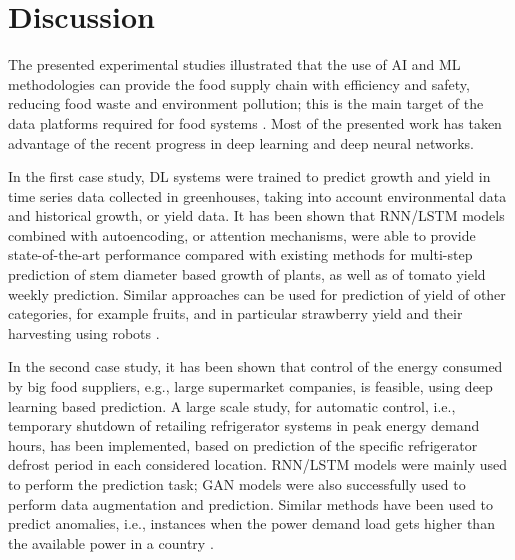 \documentclass[journal,article,accept,moreauthors,pdftex]{Definitions/mdpi}
\begin{document}


\section{Discussion}

The presented experimental studies illustrated that the use of AI and ML methodologies can provide the food supply chain with efficiency and safety, reducing food waste and environment pollution; this is the main target of the data platforms required for food systems \cite{ref52, ref53}.
Most of the presented work has taken advantage of the recent progress in deep learning and deep neural networks. 

In the first  case study, DL systems were trained to predict growth and yield in time series data collected in greenhouses, taking into account environmental data and historical growth, or yield data. It has been shown that RNN/LSTM models combined with autoencoding, or attention mechanisms, were able to provide state-of-the-art performance compared with existing  methods for multi-step prediction of stem diameter based growth of plants, as well as of tomato yield weekly prediction.  Similar approaches can be used for prediction of yield of other categories, for example fruits, and in particular strawberry yield and their harvesting using robots \cite{ref54, ref55}. 

In the second case study, it has been shown that control of the energy consumed  by big food suppliers, e.g., large supermarket companies, is feasible, using deep learning based prediction. A large scale  study, for automatic control, i.e., temporary shutdown of retailing refrigerator systems in peak energy demand hours, has been implemented, based on prediction of the specific refrigerator defrost period in each considered location. RNN/LSTM models were mainly used to perform the prediction task; GAN models were also successfully used to perform data augmentation and prediction. Similar methods have been used to predict  anomalies, i.e., instances  when  the  power demand  load  gets  higher  than  the available power in a country \cite{ref61}. 
\end{document}
